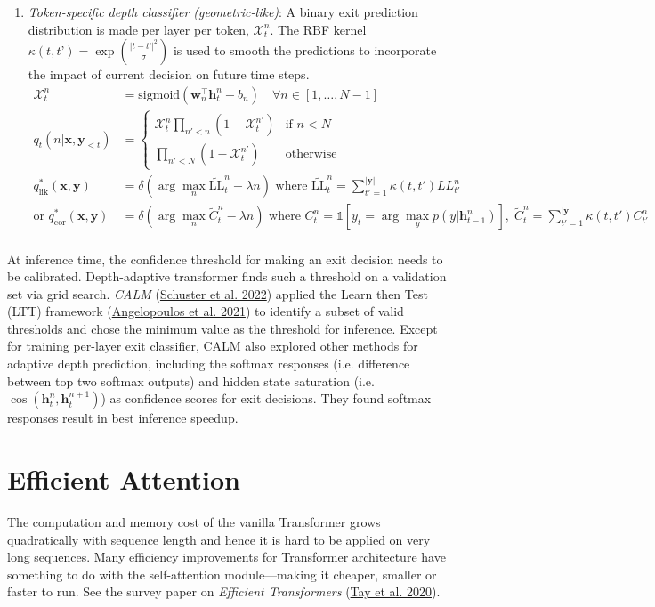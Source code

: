 \documentclass[12pt]{article}
\begin{document}
\begin{enumerate}
\item \emph{Token-specific depth classifier (geometric-like)}:  A binary exit prediction distribution is made per layer per token, $\mathcal{X}^n_t$. The RBF kernel $\kappa(t, t’) = \exp(\frac{\vert t - t’ \vert^2}{\sigma})$ is used to smooth the predictions to incorporate the impact of current decision on future time steps.
\[
\begin{aligned}
\mathcal{X}^n_t &= \text{sigmoid}(\mathbf{w}_n^\top \mathbf{h}^n_t + b_n)\quad \forall n \in [1, \dots, N-1] \\
q_t(n \vert \mathbf{x}, \mathbf{y}_{< t}) &= \begin{cases}
\mathcal{X}^n_t \prod_{n' < n} (1 - \mathcal{X}^{n'}_t) & \text{if } n < N\\
\prod_{n' < N} (1 - \mathcal{X}^{n'}_t) & \text{otherwise}
\end{cases} \\
q_\text{lik}^*(\mathbf{x}, \mathbf{y}) &= \delta(\arg\max_n \widetilde{\text{LL}}^n_t - \lambda n) \text{ where } \widetilde{\text{LL}}^n_t = \sum_{t'=1}^{\vert\mathbf{y}\vert}\kappa(t, t') LL^n_{t'} \\
\text{or }q_\text{cor}^*(\mathbf{x}, \mathbf{y}) &= \delta(\arg\max_n \tilde{C}_t^n - \lambda n) \text{ where }C_t^n = \mathbb{1}[y_t = \arg\max_y p(y \vert \mathbf{h}^n_{t-1})],\; \tilde{C}^n_t = \sum_{t'=1}^{\vert\mathbf{y}\vert}\kappa(t, t') C^n_{t'} \\
\end{aligned}
\]
\end{enumerate}

At inference time, the confidence threshold for making an exit decision needs to be calibrated. Depth-adaptive transformer finds such a threshold on a validation set via grid search. \emph{CALM} (\href{https://arxiv.org/abs/2207.07061}{Schuster et al. 2022}) applied the Learn then Test (LTT) framework (\href{https://arxiv.org/abs/2110.01052}{Angelopoulos et al. 2021}) to identify a subset of valid thresholds and chose the minimum value as the threshold for inference. Except for training per-layer exit classifier, CALM also explored other methods for adaptive depth prediction, including the softmax responses (i.e. difference between top two softmax outputs) and hidden state saturation (i.e. $\cos(\mathbf{h}^n_t, \mathbf{h}^{n+1}_t)$) as confidence scores for exit decisions. They found softmax responses result in best inference speedup.

\section{Efficient Attention}
The computation and memory cost of the vanilla Transformer grows quadratically with sequence length and hence it is hard to be applied on very long sequences. Many efficiency improvements for Transformer architecture have something to do with the self-attention module---making it cheaper, smaller or faster to run. See the survey paper on \emph{Efficient Transformers} (\href{https://arxiv.org/abs/2009.06732}{Tay et al. 2020}).
\end{document}
